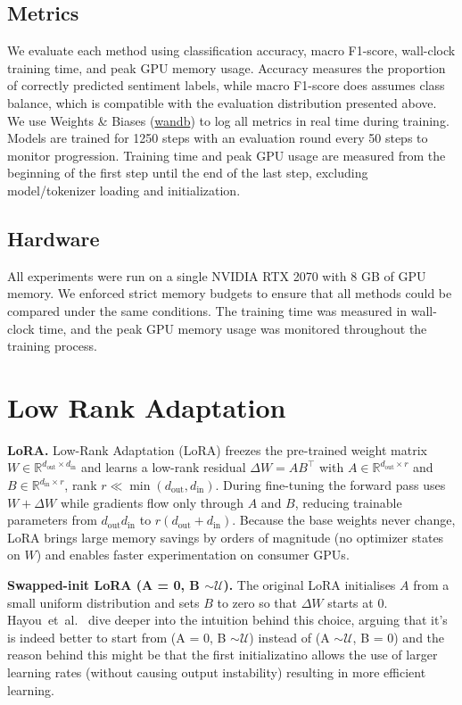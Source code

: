\documentclass[a4paper,10pt,twocolumn,english]{article}
\begin{document}
\subsection{Metrics}
We evaluate each method using classification accuracy, macro F1-score, wall-clock training time, and peak GPU memory usage. Accuracy measures the proportion of correctly predicted sentiment labels, while macro F1-score does assumes class balance, which is compatible with the evaluation distribution presented above. We use Weights \& Biases (\href{https://wandb.ai/site/}{wandb}) to log all metrics in real time during training. Models are trained for 1250 steps with an evaluation round every 50 steps to monitor progression. Training time and peak GPU usage are measured from the beginning of the first step until the end of the last step, excluding model/tokenizer loading and initialization.


\subsection{Hardware} All experiments were run on a single NVIDIA RTX 2070 with 8 GB of GPU memory. We enforced strict memory budgets to ensure that all methods could be compared under the same conditions. The training time was measured in wall-clock time, and the peak GPU memory usage was monitored throughout the training process.

\section{Low Rank Adaptation}
\noindent\textbf{LoRA.}  Low-Rank Adaptation (LoRA) \cite{hu2021loralowrankadaptationlarge} freezes the pre-trained weight matrix $W\!\in\!\mathbb{R}^{d_{\text{out}}\times d_{\text{in}}}$ and learns a low-rank residual $\Delta W = A B^{\top}$ with $A\!\in\!\mathbb{R}^{d_{\text{out}}\times r}$ and $B\!\in\!\mathbb{R}^{d_{\text{in}}\times r}$, rank $r\!\ll\!\min(d_{\text{out}},d_{\text{in}})$.  During fine-tuning the forward pass uses $W+\Delta W$ while gradients flow only through $A$ and $B$, reducing trainable parameters from $d_{\text{out}}d_{\text{in}}$ to $r(d_{\text{out}}+d_{\text{in}})$.  Because the base weights never change, LoRA brings large memory savings by orders of magnitude (no optimizer states on $W$) and enables faster experimentation on consumer GPUs.

\noindent\textbf{Swapped-init LoRA (A = 0, B $\sim\mathcal{U}$).}  The original LoRA initialises $A$ from a small uniform distribution and sets $B$ to zero so that $\Delta W$ starts at 0.  Hayou~et~al.\ \cite{hayou2024impactinitializationlorafinetuning} dive deeper into the intuition behind this choice, arguing that it's is indeed better to start from (A = 0, B $\sim\mathcal{U}$) instead of (A $\sim\mathcal{U}$, B = 0) and the reason behind this might be that the first initializatino allows the use of larger learning rates (without causing output instability) resulting in more efficient learning.
\end{document}
